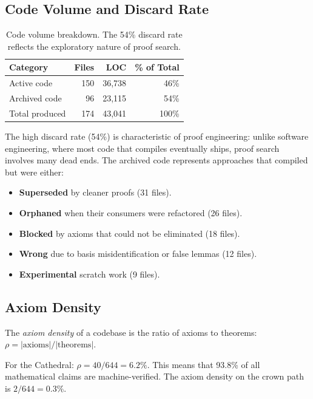 \documentclass[11pt,a4paper]{article}
\begin{document}
\subsection{Code Volume and Discard Rate}

\begin{table}[h]
\centering
\begin{tabular}{@{}lrrr@{}}
\toprule
\textbf{Category} & \textbf{Files} & \textbf{LOC} & \textbf{\% of Total} \\
\midrule
Active code & 150 & 36,738 & 46\% \\
Archived code & 96 & 23,115 & 54\% \\
\midrule
Total produced & 174 & 43,041 & 100\% \\
\bottomrule
\end{tabular}
\caption{Code volume breakdown. The 54\% discard rate reflects the
exploratory nature of proof search.}
\label{tab:volume}
\end{table}

The high discard rate (54\%) is characteristic of proof engineering:
unlike software engineering, where most code that compiles eventually
ships, proof search involves many dead ends. The archived code
represents approaches that compiled but were either:

\begin{itemize}
  \item \textbf{Superseded} by cleaner proofs (31 files).
  \item \textbf{Orphaned} when their consumers were refactored (26 files).
  \item \textbf{Blocked} by axioms that could not be eliminated (18 files).
  \item \textbf{Wrong} due to basis misidentification or false lemmas (12 files).
  \item \textbf{Experimental} scratch work (9 files).
\end{itemize}

\subsection{Axiom Density}

\begin{definition}
The \emph{axiom density} of a codebase is the ratio of axioms to
theorems: $\rho = |\text{axioms}| / |\text{theorems}|$.
\end{definition}

For the Cathedral: $\rho = 40 / 644 = 6.2\%$. This means that
93.8\% of all mathematical claims are machine-verified. The axiom
density on the crown path is $2 / 644 = 0.3\%$.
\end{document}

